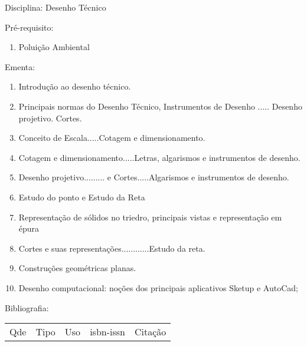 \documentclass[12pt,a4paper,twoside]{report}
\begin{document}
Disciplina: Desenho Técnico

Pré-requisito:
\begin{enumerate}
\item Poluição Ambiental
\end{enumerate}

Ementa:
\begin{enumerate}
\item Introdução ao desenho técnico.
\item Principais normas do Desenho Técnico, Instrumentos de Desenho ..... Desenho projetivo. Cortes.
\item Conceito de Escala.....Cotagem e dimensionamento.
\item Cotagem e dimensionamento.....Letras, algarismos e instrumentos de desenho.
\item Desenho projetivo......... e Cortes.....Algarismos e instrumentos de desenho.
\item Estudo do ponto e Estudo da Reta
\item Representação de sólidos no triedro, principais vistas e representação em épura
\item Cortes e suas representações............Estudo da reta.
\item Construções geométricas planas.
\item Desenho computacional: noções dos principais aplicativos Sketup e AutoCad;
\end{enumerate}

Bibliografia:
\begin{tabular}{lllll}
Qde & Tipo & Uso & isbn-issn & Citação \\
\end{tabular}
\end{document}
